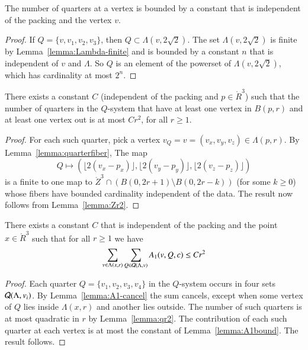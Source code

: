 \begin{lemma} \label{lemma:quarterfiber}
The number of quarters at a vertex is bounded by a constant that
is independent of the packing and the vertex $v$.
\end{lemma}

\begin{proof}  If $Q=\{v,v_1,v_2,v_3\}$, then $Q\subset
\Lambda(v,2\sqrt2)$.  The set $\Lambda(v,2\sqrt2)$ is finite by
Lemma~\ref{lemma:Lambda-finite} and is bounded by a constant $n$
that is independent of $v$ and $\Lambda$.  So $Q$ is an element of
the powerset of $\Lambda(v,2\sqrt2)$, which has cardinality at
most $2^n$.
\end{proof}

\begin{lemma}\label{lemma:qr2} There exists a constant $C$ (independent of the
packing and $p\in\ring{R}^3$) such that the number of
quarters in the $Q$-system that have at least one vertex in
$B(p,r)$ and at least one vertex out is at most $C r^2$, for all
$r\ge 1$.
\end{lemma}

\begin{proof}  For each such quarter, pick a vertex $v_Q=v=(v_x,v_y,v_z)\in
\Lambda(p,r)$.  By Lemma~\ref{lemma:quarterfiber}, The map
    $$
    Q\mapsto (\lfloor 2(v_x-p_x)\rfloor, \lfloor
    2(v_y-p_y)\rfloor,\lfloor 2(v_z-p_z)\rfloor)
    $$
is a finite to one map to $\ring{Z}^3 \cap ( B(0,2r+1) \setminus
B(0,2r-k))$ (for some $k\ge 0$) whose fibers have bounded
cardinality independent of the data.  The result now follows from
Lemma~\ref{lemma:Zr2}.
\end{proof}

\begin{lemma}\label{lemma:negA1} There exists a constant $C$ that is independent of
the packing and the point $x\in\ring{R}^3$ such that for
all $r\ge 1$ we have
$$\sum_{v\in\Lambda(x,r)} \sum_{Q\in{\mathcal Q}(\Lambda,v)}
      A_1 (v,Q,c) \le C r^2$$
\end{lemma}

\begin{proof}
Each quarter $Q=\{v_1,v_2,v_3,v_4\}$ in the $Q$-system occurs in
four sets ${\mathcal Q}(\Lambda,v_i)$.  By
Lemma~\ref{lemma:A1-cancel} the sum cancels, except when some
vertex of $Q$ lies inside $\Lambda(x,r)$ and another lies outside.
The number of such quarters is at most quadratic in $r$ by
Lemma~\ref{lemma:qr2}.  The contribution of each such quarter at
each vertex is at most the constant of Lemma~\ref{lemma:A1bound}.
The result follows.
\end{proof}

